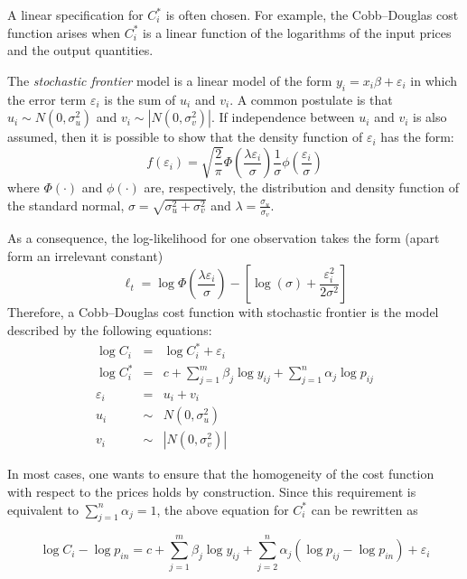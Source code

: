 A linear specification for $C_i^*$ is often chosen. For example, the
Cobb--Douglas cost function arises when $C_i^*$ is a linear function
of the logarithms of the input prices and the output quantities.

The \emph{stochastic frontier} model is a linear model of the form
$y_i = x_i \beta + \varepsilon_i$ in which the error term
$\varepsilon_i$ is the sum of $u_i$ and $v_i$.  A common postulate is
that $u_i \sim N(0,\sigma_u^2)$ and $v_i \sim
\left|N(0,\sigma_v^2)\right|$. If independence between $u_i$ and $v_i$
is also assumed, then it is possible to show that the density function
of $\varepsilon_i$ has the form:
\begin{equation}
  \label{eq:frontdens}
  f(\varepsilon_i) = 
   \sqrt{\frac{2}{\pi}} 
   \Phi\left(\frac{\lambda \varepsilon_i}{\sigma}\right)
   \frac{1}{\sigma} \phi\left(\frac{\varepsilon_i}{\sigma}\right)
\end{equation}
where $\Phi(\cdot)$ and $\phi(\cdot)$ are, respectively, the distribution and density
function of the standard normal, $\sigma =
\sqrt{\sigma^2_u + \sigma^2_v}$ and $\lambda = \frac{\sigma_u}{\sigma_v}$.

As a consequence, the log-likelihood for one observation takes the
form (apart form an irrelevant constant)
\[
  \ell_t = 
  \log\Phi\left(\frac{\lambda \varepsilon_i}{\sigma}\right) -
  \left[ \log(\sigma) + \frac{\varepsilon_i^2}{2 \sigma^2} \right]
\]
Therefore, a Cobb--Douglas cost function with stochastic frontier is the
model described by the following equations: 
\begin{eqnarray*}
  \log C_i & = & \log C^*_i + \varepsilon_i \\
  \log C^*_i & = & c + \sum_{j=1}^m \beta_j \log y_{ij} + \sum_{j=1}^n \alpha_j \log p_{ij} \\
  \varepsilon_i & = & u_i + v_i \\
  u_i & \sim & N(0,\sigma_u^2) \\
  v_i & \sim & \left|N(0,\sigma_v^2)\right| 
\end{eqnarray*}

In most cases, one wants to ensure that the homogeneity of the cost
function with respect to the prices holds by construction. Since this
requirement is equivalent to $\sum_{j=1}^n \alpha_j = 1$, the above
equation for $C^*_i$ can be rewritten as

\begin{equation}
  \label{eq:CobbDouglasFrontier}
  \log C_i - \log p_{in}  = c + \sum_{j=1}^m \beta_j \log y_{ij} +
  \sum_{j=2}^n \alpha_j (\log p_{ij} - \log p_{in})  + \varepsilon_i
\end{equation}

